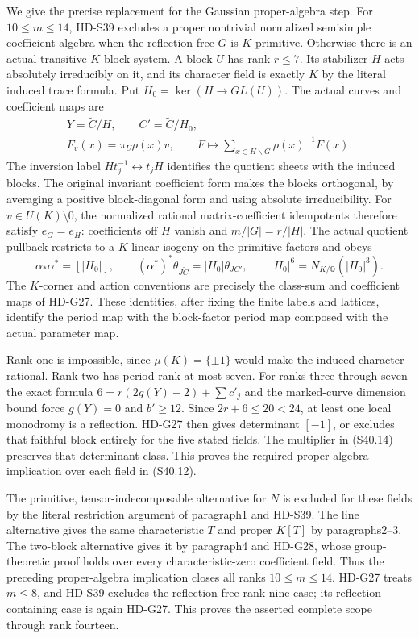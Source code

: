We give the precise replacement for the Gaussian proper-algebra
step. For \(10\le m\le14\), HD-S39 excludes a proper
nontrivial normalized semisimple coefficient algebra when the
reflection-free \(G\) is \(K\)-primitive. Otherwise there
is an actual transitive \(K\)-block system. A block \(U\)
has rank \(r\le7\). Its stabilizer \(H\) acts absolutely
irreducibly on it, and its character field is exactly \(K\)
by the literal induced trace formula. Put
\(H_0=\ker(H\to GL(U))\). The actual curves and coefficient
maps are
\[
 \begin{gathered}
 Y=\widetilde C/H,\qquad C'=\widetilde C/H_0,\\
 F_v(x)=\pi_U\rho(x)v,\qquad
 F\longmapsto\sum_{x\in H\backslash G}\rho(x)^{-1}F(x).
 \end{gathered}                                               \tag{S40.13}
\]
The inversion label \(Ht_j^{-1}\leftrightarrow t_jH\)
identifies the quotient sheets with the induced blocks.
The original invariant coefficient form makes the blocks
orthogonal, by averaging a positive block-diagonal form and
using absolute irreducibility. For \(v\in U(K)\setminus0\),
the normalized rational matrix-coefficient idempotents therefore
satisfy \(e_G=e_H\): coefficients off \(H\) vanish and
\(m/|G|=r/|H|\). The actual quotient pullback restricts to
a \(K\)-linear isogeny on the primitive factors and obeys
\[
 \alpha_*\alpha^*=[|H_0|],\qquad
 (\alpha^*)^*\theta_{J\widetilde C}=|H_0|\theta_{JC'},\qquad
          |H_0|^6=N_{K/\mathbb Q}(|H_0|^3).                 \tag{S40.14}
\]
The \(K\)-corner and action conventions are precisely the
class-sum and coefficient maps of HD-G27. These identities,
after fixing the finite labels and lattices, identify the
period map with the block-factor period map composed with the
actual parameter map.

Rank one is impossible, since \(\mu(K)=\{\pm1\}\) would
make the induced character rational. Rank two has period rank
at most seven. For ranks three through seven the exact formula
\(6=r(2g(Y)-2)+\sum c'_j\) and the marked-curve dimension
bound force \(g(Y)=0\) and \(b'\ge12\). Since
\(2r+6\le20<24\), at least one local monodromy is a
reflection. HD-G27 then gives determinant \([-1]\), or
excludes that faithful block entirely for the five stated
fields. The multiplier in (S40.14) preserves that determinant
class. This proves the required proper-algebra implication over
each field in (S40.12).

The primitive, tensor-indecomposable alternative for \(N\)
is excluded for these fields by the literal restriction argument
of paragraph1 and HD-S39. The line alternative gives the same
characteristic \(T\) and proper \(K[T]\) by paragraphs2--3.
The two-block alternative gives it by paragraph4 and HD-G28,
whose group-theoretic proof holds over every characteristic-zero
coefficient field. Thus the preceding proper-algebra implication
closes all ranks \(10\le m\le14\). HD-G27 treats
\(m\le8\), and HD-S39 excludes the reflection-free rank-nine
case; its reflection-containing case is again HD-G27.
This proves the asserted complete scope through rank fourteen.

